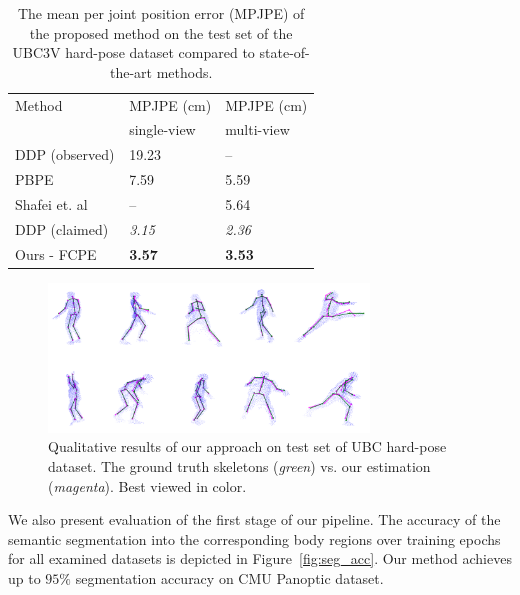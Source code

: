 \setlength{\tabcolsep}{4pt}
\begin{table}[H]
\begin{center}
\caption[Mean per joint position error on UBC3V hard-pose dataset, compared to state-of-the-art methods.]{The mean per joint position error (MPJPE) of the proposed method on the test set of the UBC3V hard-pose dataset compared to state-of-the-art methods.}
\label{table:UBC_results}
\begin{tabular}{lll}
\hline\noalign{\smallskip}
Method & MPJPE (cm) & MPJPE (cm) \\
& single-view & multi-view\\
\noalign{\smallskip}
\hline
\noalign{\smallskip}
DDP (observed) &  19.23 & –\\
PBPE~\cite{Ali19} & 7.59 & 5.59\\
Shafei et. al~\cite{Shafaei16} & – & 5.64\\
DDP (claimed)~\cite{Marin18jvcir} & {\it 3.15} & {\it 2.36}\\
\hline\noalign{\smallskip}
Ours - FCPE & {\bf 3.57} & {\bf 3.53}\\
\hline
\end{tabular}
\end{center}
\end{table}
\setlength{\tabcolsep}{1.4pt}


\begin{figure}[H]
\begin{center}
\centering
\includegraphics[height=150px]{images/results/UBC_results.png}
\caption[Qualitative results on test set of UBC hard-pose dataset.]{Qualitative results of our approach on test set of UBC hard-pose dataset. The ground truth skeletons ({\it green}) vs. our estimation ({\it magenta}). Best viewed in color.}
\label{fig:ubc_results}
\end{center}
\end{figure}

\noindent
We also present evaluation of the first stage of our pipeline. The accuracy of the semantic segmentation into the corresponding body regions over training epochs for all examined datasets is depicted in Figure~\ref{fig:seg_acc}. Our method achieves up to $95\%$ segmentation accuracy on CMU Panoptic dataset.\par
\vspace{5mm}

